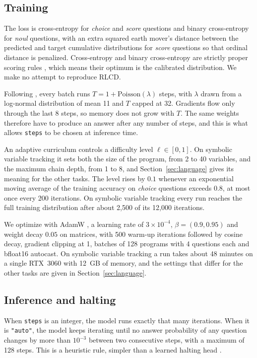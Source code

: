 \documentclass{article}
\begin{document}
\subsection{Training}

The loss is cross-entropy for \emph{choice} and \emph{score} questions and binary cross-entropy for \emph{noul} questions, with an extra squared earth mover's distance between the predicted and target cumulative distributions for \emph{score} questions so that ordinal distance is penalized. Cross-entropy and binary cross-entropy are strictly proper scoring rules \cite{gneiting2007scoring}, which means their optimum is the calibrated distribution. We make no attempt to reproduce RLCD.

Following \cite{geiping2025scaling}, every batch runs $T = 1 + \mathrm{Poisson}(\lambda)$ steps, with $\lambda$ drawn from a log-normal distribution of mean 11 and $T$ capped at 32. Gradients flow only through the last 8 steps, so memory does not grow with $T$. The same weights therefore have to produce an answer after any number of steps, and this is what allows \texttt{steps} to be chosen at inference time.

An adaptive curriculum controls a difficulty level $\ell \in [0, 1]$. On symbolic variable tracking it sets both the size of the program, from 2 to 40 variables, and the maximum chain depth, from 1 to 8, and Section~\ref{sec:language} gives its meaning for the other tasks. The level rises by $0.1$ whenever an exponential moving average of the training accuracy on \emph{choice} questions exceeds $0.8$, at most once every 200 iterations. On symbolic variable tracking every run reaches the full training distribution after about 2{,}500 of its 12{,}000 iterations.

We optimize with AdamW \cite{loshchilov2019adamw}, a learning rate of $3\times10^{-4}$, $\beta = (0.9, 0.95)$ and weight decay $0.05$ on matrices, with 500 warm-up iterations followed by cosine decay, gradient clipping at 1, batches of 128 programs with 4 questions each and bfloat16 autocast. On symbolic variable tracking a run takes about 48 minutes on a single RTX~3060 with 12~GB of memory, and the settings that differ for the other tasks are given in Section~\ref{sec:language}.

\subsection{Inference and halting}

When \texttt{steps} is an integer, the model runs exactly that many iterations. When it is \texttt{"auto"}, the model keeps iterating until no answer probability of any question changes by more than $10^{-3}$ between two consecutive steps, with a maximum of 128 steps. This is a heuristic rule, simpler than a learned halting head \cite{graves2016adaptive, banino2021pondernet}.
\end{document}
